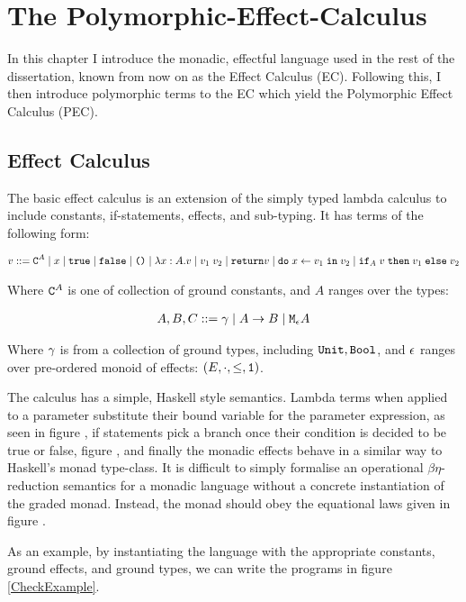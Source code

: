 \documentclass{Report}
\begin{document}
\chapter{The Polymorphic-Effect-Calculus}
In this chapter I introduce the monadic, effectful language used in the rest of the dissertation, known from now on as the Effect Calculus (EC). Following this, I then introduce polymorphic terms to the EC which yield the Polymorphic Effect Calculus (PEC).

\section{Effect Calculus}

The basic effect calculus is an extension of the simply typed lambda calculus to include constants, if-statements, effects, and sub-typing. It has terms of the following form:

\begin{align}
    v ::= \texttt{C}^{A} \mid x\mid \texttt{true} \mid\texttt{false} \mid\texttt{()}\mid\lambda x : A. v\mid v_1\; v_2\mid\texttt{return} v\mid\texttt{do}\; x \leftarrow v_1 \;\texttt{in}\; v_2\mid\texttt{if}_{A}\; v\; \texttt{then}\; v_1 \;\texttt{else} \; v_2 
\end{align}

Where $\texttt{C}^{A}$ is one of collection of ground constants, and $A$ ranges over the types:

\begin{align}
    A, B, C ::= \gamma\mid A\rightarrow B \mid\texttt{M}_{\epsilon}{A}
\end{align}

Where $\gamma$ is from a collection of ground types, including $\texttt{Unit}, \texttt{Bool}$, and $\epsilon$ ranges over pre-ordered monoid of effects: $(E, \cdot, \leq, \texttt{1})$.

The calculus has a simple, Haskell style semantics. Lambda terms when applied to a parameter substitute their bound variable for the parameter expression, as seen in figure \todo{}, if statements pick a branch once their condition is decided to be true or false, figure \todo{}, and finally the monadic effects behave in a similar way to Haskell's monad type-class. It is difficult to simply formalise an operational $\beta\eta$-reduction semantics for a monadic language without a concrete instantiation of the graded monad. Instead, the monad should obey the equational laws given in figure \todo{}.


As an example, by instantiating the language with the appropriate constants, ground effects, and ground types, we can write the programs in figure \ref{CheckExample}.
\end{document}
